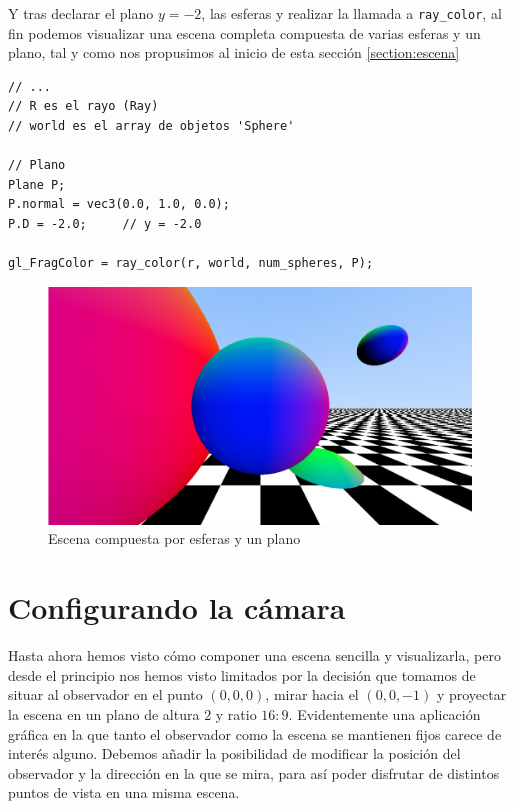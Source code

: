 Y tras declarar el plano $y=-2$, las esferas y realizar la llamada a \verb|ray_color|, al fin podemos visualizar una escena completa compuesta de varias esferas y un plano, tal y como nos propusimos al inicio de esta sección \ref{section:escena}

\begin{lstlisting}
// ... 
// R es el rayo (Ray)
// world es el array de objetos 'Sphere'

// Plano
Plane P;
P.normal = vec3(0.0, 1.0, 0.0);
P.D = -2.0;     // y = -2.0

gl_FragColor = ray_color(r, world, num_spheres, P);
\end{lstlisting}

\begin{figure} [ht]
    \centering
    \includegraphics[scale = 0.25]{img/C8/escena-completa.png}
    \caption{Escena compuesta por esferas y un plano}
    \label{fig:escena-completa}
\end{figure}

\section{Configurando la cámara}
\label{section:camara}

Hasta ahora hemos visto cómo componer una escena sencilla y visualizarla, pero desde el principio nos hemos visto limitados por la decisión que tomamos de situar al observador en el punto $(0,0,0)$, mirar hacia el $(0,0,-1)$ y proyectar la escena en un plano de altura $2$ y ratio $16:9$. Evidentemente una aplicación gráfica en la que tanto el observador como la escena se mantienen fijos carece de interés alguno. Debemos añadir la posibilidad de modificar la posición del observador y la dirección en la que se mira, para así poder disfrutar de distintos puntos de vista en una misma escena.

